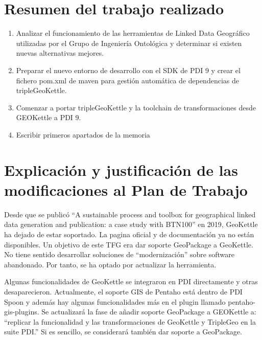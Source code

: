 \documentclass[11pt]{article}
\begin{document}
\maketitle
\tableofcontents
\newpage

\section{Resumen del trabajo realizado}
\begin{enumerate}
    \item Analizar el funcionamiento de las herramientas de Linked Data Geográfico utilizadas por el Grupo de
        Ingeniería Ontológica y determinar si existen nuevas alternativas mejores.

    \item Preparar el nuevo entorno de desarrollo con el SDK de PDI 9 y crear el fichero pom.xml de maven para
        gestión automática de dependencias de tripleGeoKettle.

    \item Comenzar a portar tripleGeoKettle y la toolchain de transformaciones desde GEOKettle a PDI 9.

    \item Escribir primeros apartados de la memoria
\end{enumerate}


\section{Explicación y justificación de las modificaciones al Plan de Trabajo}

Desde que se publicó ``A sustainable process and toolbox for geographical linked data generation and
publication: a case study with BTN100'' en 2019, GeoKettle ha dejado de estar soportado. La pagina oficial y de
documentación ya no están disponibles.
Un objetivo de este TFG era dar soporte GeoPackage a GeoKettle. No tiene sentido desarrollar soluciones de
``modernización'' sobre software abandonado. Por tanto, se ha optado por actualizar la herramienta.

Algunas funcionalidades de GeoKettle se integraron en PDI directamente y otras desaparecieron.
Actualmente, el soporte GIS de Pentaho está dentro de PDI Spoon y además hay algunas funcionalidades más en
 el plugin llamado pentaho-gis-plugins. Se actualizará la fase de añadir soporte GeoPackage a GEOKettle a:
``replicar la funcionalidad y las transformaciones de GeoKettle y TripleGeo en la suite PDI.'' Si es sencillo,
se considerará también dar soporte a GeoPackage.
\end{document}

